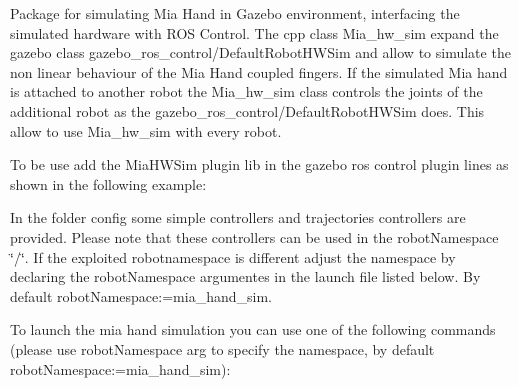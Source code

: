 Package for simulating Mia Hand in Gazebo environment, interfacing the simulated hardware with R\+OS Control. The cpp class Mia\+\_\+hw\+\_\+sim expand the gazebo class gazebo\+\_\+ros\+\_\+control/\+Default\+Robot\+H\+W\+Sim and allow to simulate the non linear behaviour of the Mia Hand coupled fingers. If the simulated Mia hand is attached to another robot the Mia\+\_\+hw\+\_\+sim class controls the joints of the additional robot as the gazebo\+\_\+ros\+\_\+control/\+Default\+Robot\+H\+W\+Sim does. This allow to use Mia\+\_\+hw\+\_\+sim with every robot.

To be use add the Mia\+H\+W\+Sim plugin lib in the gazebo ros control plugin lines as shown in the following example\+:



In the folder config some simple controllers and trajectories controllers are provided. Please note that these controllers can be used in the robot\+Namespace \char`\"{}/\char`\"{}. If the exploited robotnamespace is different adjust the namespace by declaring the robot\+Namespace argumentes in the launch file listed below. By default robot\+Namespace\+:=mia\+\_\+hand\+\_\+sim.

To launch the mia hand simulation you can use one of the following commands (please use robot\+Namespace arg to specify the namespace, by default robot\+Namespace\+:=mia\+\_\+hand\+\_\+sim)\+:


